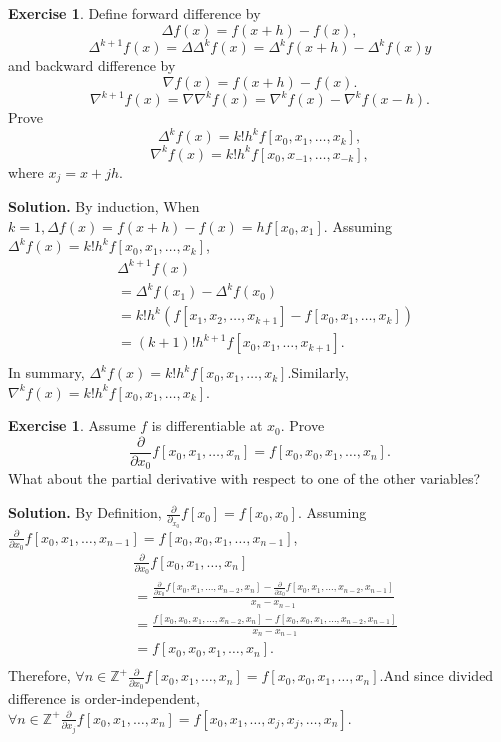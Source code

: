 \documentclass[a4paper]{book}
\newenvironment{solution}%
{\noindent\textbf{Solution.}}%
{\qedhere}
\numberwithin{equation}{chapter}
\theoremstyle{definition}
\newtheorem{exc}[exm]{Exercise}
\begin{document}
\begin{exc}
  Define forward difference by
  \[ \Delta f(x) = f(x + h) - f(x), \]
  \[ \Delta^{k+1}f(x) = \Delta \Delta^{k}f(x) = \Delta^{k}f(x+h) - \Delta^{k}f(x)y\]
  and backward difference by
  \[ \nabla f(x) = f(x + h) - f(x). \]
  \[ \nabla^{k+1}f(x) = \nabla\nabla^{k}f(x) = \nabla^{k}f(x) - \nabla^{k}f(x - h). \]
  Prove
  \[ \Delta^{k}f(x) = k! h^k f[x_0,x_1,\dots, x_k], \]
  \[ \nabla^{k}f(x) = k! h^k f[x_0,x_{-1}, \dots, x_{-k}],\]
  where $x_j = x + jh$.
\end{exc}

\begin{solution}
  By induction, When $k = 1, \Delta f(x) = f(x+h) - f(x) = hf[x_0,x_1]$.
  Assuming $ \Delta^{k}f(x) = k! h^k f[x_0,x_1,\dots, x_k] $,
  \begin{align*}
    &\Delta^{k+1}f(x) \\
    &= \Delta^{k}f(x_1) - \Delta^{k}f(x_0) \\
    &= k!h^k(f[x_1,x_2,\dots,x_{k+1}] - f[x_0,x_1,\dots,x_{k}]) \\
    &= (k+1)!h^{k+1}f[x_0,x_1, \dots,x_{k+1}]. \\
  \end{align*}
  In summary, $\Delta^{k}f(x) = k! h^k f[x_0,x_1,\dots, x_k]$.Similarly, $\nabla^{k}f(x) = k! h^k f[x_0,x_1,\dots, x_k]$.
\end{solution}

\begin{exc}
  Assume $f$ is differentiable at $x_0$. Prove
  \[ \frac{\partial}{\partial x_0}f[x_0, x_1, \dots, x_n] = f[x_0, x_0, x_1, \dots, x_n].\]
  What about the partial derivative with respect to one of the other variables?
\end{exc}

\begin{solution}
  By Definition, $\frac{\partial}{\partial_{x_0}}f[x_0] = f[x_0,x_0]$.
  Assuming $\frac{\partial}{\partial x_0}f[x_0, x_1, \dots, x_{n-1}] = f[x_0, x_0, x_1, \dots, x_{n-1}] $,
  \begin{align*}
    &\frac{\partial}{\partial x_0}f[x_0, x_1, \dots, x_{n}]  \\
    &=\frac{\frac{\partial}{\partial x_0}f[x_0, x_1, \dots,x_{n-2}, x_{n}] - \frac{\partial}{\partial x_0}f[x_0, x_1, \dots,x_{n-2}, x_{n-1}]}{x_n - x_{n-1}} \\
    &=\frac{f[x_0, x_0, x_1, \dots,x_{n-2}, x_{n}] - f[x_0, x_0, x_1, \dots,x_{n-2}, x_{n-1}]}{x_n - x_{n-1}} \\
    &=f[x_0, x_0, x_1, \dots, x_n]. \\
  \end{align*}
  Therefore, $ \forall n \in \mathbb{Z}^+ \frac{\partial}{\partial x_0}f[x_0, x_1, \dots, x_n] = f[x_0, x_0, x_1, \dots, x_n]$.And since divided difference is order-independent, $\forall n \in \mathbb{Z}^+ \frac{\partial}{\partial x_j}f[x_0, x_1, \dots, x_n] = f[x_0, x_1, \dots,x_j,x_j,\dots, x_n]$.
\end{solution}
\end{document}
